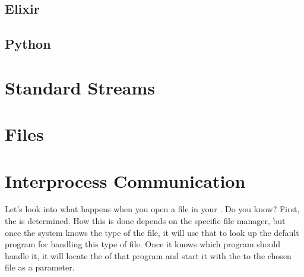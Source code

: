 \subsection{\csharp}
\subsection{Elixir}
\subsection{Python}

\section{Standard Streams}
\label{sec:io:streams}

\subsection{\csharp}

\section{Files}
\label{io:files}
\subsection{\csharp}

\section{Interprocess Communication}

Let's look into what happens when you open a file in your . Do you know? First, the  is determined. How this is done depends on the specific file manager, but once the system knows the type of the file, it will use that to look up the default program for handling this type of file. Once it knows which program should handle it, it will locate the  of that program and start it with the  to the chosen file as a parameter.

